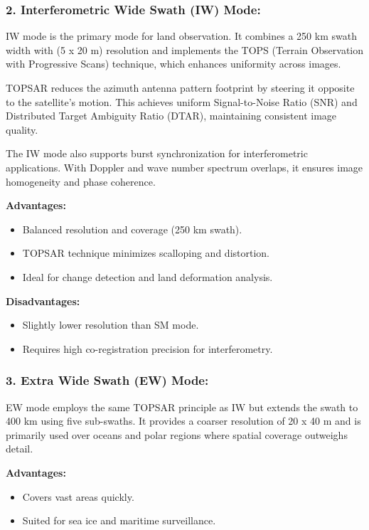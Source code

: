 \subsubsection{\textbf{2. Interferometric Wide Swath (IW) Mode:}}

IW mode is the primary mode for land observation. It combines a 250 km swath width with (5 x 20 m) resolution and implements the TOPS (Terrain Observation with Progressive Scans) technique, which enhances uniformity across images.

TOPSAR reduces the azimuth antenna pattern footprint by steering it opposite to the satellite’s motion. This achieves uniform Signal-to-Noise Ratio (SNR) and Distributed Target Ambiguity Ratio (DTAR), maintaining consistent image quality.

The IW mode also supports burst synchronization for interferometric applications. With Doppler and wave number spectrum overlaps, it ensures image homogeneity and phase coherence.


\textbf{Advantages:}
\begin{itemize}
    \item Balanced resolution and coverage (250 km swath).
    \item TOPSAR technique minimizes scalloping and distortion.
    \item Ideal for change detection and land deformation analysis.
\end{itemize}

\textbf{Disadvantages:}
\begin{itemize}
    \item Slightly lower resolution than SM mode.
    \item Requires high co-registration precision for interferometry.
\end{itemize}

\subsubsection{\textbf{3. Extra Wide Swath (EW) Mode:} }

EW mode employs the same TOPSAR principle as IW but extends the swath to 400 km using five sub-swaths. It provides a coarser resolution of 20 x 40 m and is primarily used over oceans and polar regions where spatial coverage outweighs detail.


\textbf{Advantages:}
\begin{itemize}
    \item Covers vast areas quickly.
    \item Suited for sea ice and maritime surveillance.
\end{itemize}

